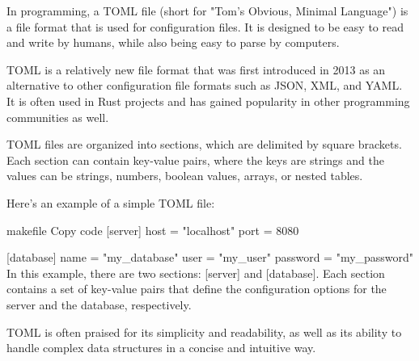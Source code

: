 In programming, a TOML file (short for "Tom's Obvious, Minimal Language") is a file format that is used for configuration files. It is designed to be easy to read and write by humans, while also being easy to parse by computers.

TOML is a relatively new file format that was first introduced in 2013 as an alternative to other configuration file formats such as JSON, XML, and YAML. It is often used in Rust projects and has gained popularity in other programming communities as well.

TOML files are organized into sections, which are delimited by square brackets. Each section can contain key-value pairs, where the keys are strings and the values can be strings, numbers, boolean values, arrays, or nested tables.

Here's an example of a simple TOML file:

makefile
Copy code
[server]
host = "localhost"
port = 8080

[database]
name = "my_database"
user = "my_user"
password = "my_password"
In this example, there are two sections: [server] and [database]. Each section contains a set of key-value pairs that define the configuration options for the server and the database, respectively.

TOML is often praised for its simplicity and readability, as well as its ability to handle complex data structures in a concise and intuitive way.
